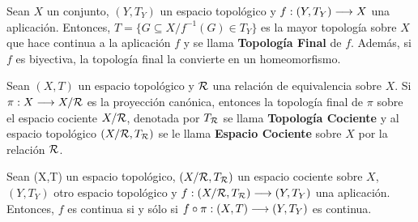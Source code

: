 \documentclass[cursovd_portada.tex]{subfiles}
\begin{document}
\begin{coro}
Sean $X$ un conjunto, $(Y,T_Y)$ un espacio topológico y $f:(Y,T_Y)\longrightarrow X$ una aplicación. Entonces, $T=\{G\subseteq
X/ f^{-1}(G)\in T_Y\}$ es la mayor topología sobre $X$ que hace continua a la aplicación $f$ y se llama {\bf
Topología Final} de $f$. Además, si $f$ es biyectiva, la topología final la convierte en un homeomorfismo.
\end{coro}
\begin{defi}
Sean $(X,T)$ un espacio topológico y ${\cal R}$ una relación de equivalencia sobre $X$. Si $\pi:X\longrightarrow X/{\cal R}$ es
la proyección canónica, entonces la topología final de $\pi$ sobre el espacio cociente $X/{\cal R}$, denotada por
$T_{{\cal R}}$ se llama {\bf Topología Cociente} y al espacio topológico $(X/{\cal R},T_{{\cal R}})$ se le llama {\bf
Espacio Cociente} sobre $X$ por la relación ${\cal R}$.
\end{defi}
\begin{prop}
Sean (X,T) un espacio topológico, $(X/{\cal R},T_{{\cal R}})$ un espacio cociente sobre $X$, $(Y,T_Y)$ otro espacio
topológico y $f:(X/{\cal R},T_{{\cal R}})\longrightarrow (Y,T_Y)$ una aplicación. Entonces, $f$ es continua si y sólo si
$f\circ\pi:(X,T)\longrightarrow (Y,T_Y)$ es continua.
\end{prop}
\end{document}
